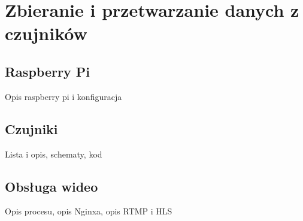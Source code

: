 \chapter{Zbieranie i przetwarzanie danych z czujników}

\section*{Raspberry Pi}

Opis raspberry pi i konfiguracja

\section*{Czujniki}

Lista i opis, schematy, kod

\section*{Obsługa wideo}

Opis procesu, opis Nginxa, opis RTMP i HLS